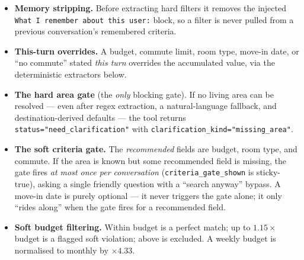 \documentclass[11pt,a4paper]{article}
\newcommand{\code}[1]{\texttt{\small #1}}
\begin{document}
\begin{itemize}[leftmargin=1.4em,itemsep=3pt]
  \item \textbf{Memory stripping.} Before extracting hard filters it removes the
        injected \code{What I remember about this user:} block, so a filter is never
        pulled from a previous conversation's remembered criteria.
  \item \textbf{This-turn overrides.} A budget, commute limit, room type, move-in
        date, or ``no commute'' stated \emph{this turn} overrides the accumulated
        value, via the deterministic extractors below.
  \item \textbf{The hard area gate} (the \emph{only} blocking gate). If no living area
        can be resolved --- even after regex extraction, a natural-language fallback,
        and destination-derived defaults --- the tool returns
        \code{status="need\_clarification"} with \code{clarification\_kind="missing\_area"}.
  \item \textbf{The soft criteria gate.} The \emph{recommended} fields are budget,
        room type, and commute. If the area is known but some recommended field is
        missing, the gate fires \emph{at most once per conversation}
        (\code{criteria\_gate\_shown} is sticky-true), asking a single friendly
        question with a ``search anyway'' bypass. A move-in date is purely optional ---
        it never triggers the gate alone; it only ``rides along'' when the gate fires
        for a recommended field.
  \item \textbf{Soft budget filtering.} Within budget is a perfect match; up to
        $1.15\times$ budget is a flagged soft violation; above is excluded. A weekly
        budget is normalised to monthly by $\times 4.33$.
\end{itemize}
\end{document}
